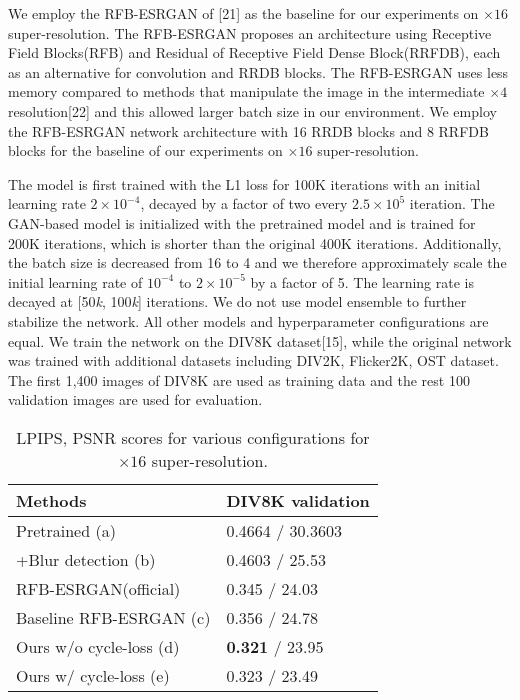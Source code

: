 \documentclass{article}
\begin{document}
We employ the RFB-ESRGAN of [21] as the baseline for our experiments on $\times16$ super-resolution. The RFB-ESRGAN proposes an architecture using Receptive Field Blocks(RFB) and Residual of Receptive Field Dense Block(RRFDB), each as an alternative for convolution and RRDB blocks. The RFB-ESRGAN uses less memory compared to methods that manipulate the image in the intermediate $\times4$ resolution[22] and this allowed larger batch size in our environment. We employ the RFB-ESRGAN network architecture with 16 RRDB blocks and 8 RRFDB blocks for the baseline of our experiments on $\times16$ super-resolution.

The model is first trained with the L1 loss for 100K iterations with an initial learning rate $2\times10^{-4}$, decayed by a factor of two every $2.5\times10^{5}$ iteration. The GAN-based model is initialized with the pretrained model and is trained for 200K iterations, which is shorter than the original 400K iterations. Additionally, the batch size is decreased from 16 to 4 and we therefore approximately scale the initial learning rate of $10^{-4}$ to $2\times10^{-5}$ by a factor of 5. The learning rate is decayed at [50\textit{k}, 100\textit{k}] iterations. We do not use model ensemble to further stabilize the network. All other models and hyperparameter configurations are equal. We train the network on the DIV8K dataset[15], while the original network was trained with additional datasets including DIV2K, Flicker2K, OST dataset. The first 1,400 images of DIV8K are used as training data and the rest 100 validation images are used for evaluation. 

\begin{table}
    \centering
    \caption{LPIPS, PSNR scores for various configurations for $\times16$ super-resolution.}
    \label{tab_numerical_geo}
    {\begin{tabular}{|l||l|}
        \hline
        Methods & DIV8K validation \\
        \hline
        Pretrained (a) & 0.4664 / 30.3603 \\[1mm]
        +Blur detection (b) & 0.4603 / 25.53 \\[1mm]
        \hline
        RFB-ESRGAN(official) & 0.345 / 24.03 \\[1mm]
        \hline
        Baseline RFB-ESRGAN (c) & 0.356 / 24.78 \\[1mm]
        Ours w/o cycle-loss (d) & \textbf{0.321} / 23.95 \\[1mm]
        Ours w/ cycle-loss (e) & 0.323 / 23.49 \\[1mm]
        \hline
    \end{tabular}
    }
    \label{tab:my_label}
\end{table}
\end{document}
